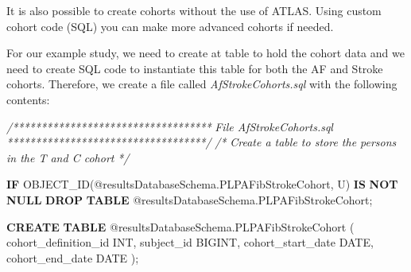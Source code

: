 \documentclass[
]{article}
\newenvironment{Shaded}{\begin{snugshade}}{\end{snugshade}}
\newcommand{\CommentTok}[1]{\textcolor[rgb]{0.56,0.35,0.01}{\textit{#1}}}
\newcommand{\ControlFlowTok}[1]{\textcolor[rgb]{0.13,0.29,0.53}{\textbf{#1}}}
\newcommand{\DataTypeTok}[1]{\textcolor[rgb]{0.13,0.29,0.53}{#1}}
\newcommand{\KeywordTok}[1]{\textcolor[rgb]{0.13,0.29,0.53}{\textbf{#1}}}
\newcommand{\NormalTok}[1]{#1}
\newcommand{\StringTok}[1]{\textcolor[rgb]{0.31,0.60,0.02}{#1}}
\begin{document}
It is also possible to create cohorts without the use of ATLAS. Using
custom cohort code (SQL) you can make more advanced cohorts if needed.

For our example study, we need to create at table to hold the cohort
data and we need to create SQL code to instantiate this table for both
the AF and Stroke cohorts. Therefore, we create a file called
\emph{AfStrokeCohorts.sql} with the following contents:

\begin{Shaded}
\begin{Highlighting}[]
\CommentTok{/***********************************}
\CommentTok{File AfStrokeCohorts.sql }
\CommentTok{***********************************/}
\CommentTok{/*}
\CommentTok{Create a table to store the persons in the T and C cohort}
\CommentTok{*/}

\ControlFlowTok{IF}\NormalTok{ OBJECT\_ID(}\StringTok{\textquotesingle{}@resultsDatabaseSchema.PLPAFibStrokeCohort\textquotesingle{}}\NormalTok{, }\StringTok{\textquotesingle{}U\textquotesingle{}}\NormalTok{) }\KeywordTok{IS} \KeywordTok{NOT} \KeywordTok{NULL} 
\KeywordTok{DROP} \KeywordTok{TABLE}\NormalTok{ @resultsDatabaseSchema.PLPAFibStrokeCohort;}

\KeywordTok{CREATE} \KeywordTok{TABLE}\NormalTok{ @resultsDatabaseSchema.PLPAFibStrokeCohort }
\NormalTok{( }
\NormalTok{cohort\_definition\_id }\DataTypeTok{INT}\NormalTok{, }
\NormalTok{subject\_id BIGINT,}
\NormalTok{cohort\_start\_date }\DataTypeTok{DATE}\NormalTok{, }
\NormalTok{cohort\_end\_date }\DataTypeTok{DATE}
\NormalTok{);}



\end{Highlighting}
\end{Shaded}
\end{document}
